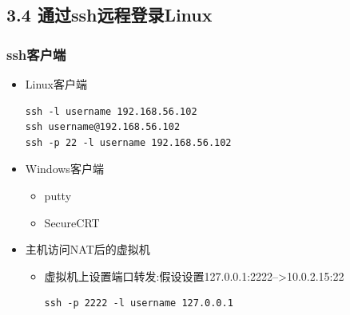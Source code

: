 \documentclass[xcolor=svgnames,bigger,presentation]{beamer}
\begin{document}
\subsection{3.4 通过ssh远程登录Linux}
\label{sec-3-4}
\begin{frame}[fragile]
\frametitle{ssh客户端}
\label{sec-3-4-1}
\begin{itemize}

\item Linux客户端\\
\label{sec-3-4-1-1}%
\begin{verbatim}
ssh -l username 192.168.56.102
ssh username@192.168.56.102
ssh -p 22 -l username 192.168.56.102
\end{verbatim}

\item Windows客户端
\label{sec-3-4-1-2}%
\begin{itemize}

\item putty
\label{sec-3-4-1-2-1}%

\item SecureCRT
\label{sec-3-4-1-2-2}%
\end{itemize} %

\item 主机访问NAT后的虚拟机
\label{sec-3-4-1-3}%
\begin{itemize}

\item 虚拟机上设置端口转发:假设设置127.0.0.1:2222-->10.0.2.15:22\\
\label{sec-3-4-1-3-1}%
\begin{verbatim}
ssh -p 2222 -l username 127.0.0.1
\end{verbatim}
\end{itemize} %
\end{itemize} %
\end{frame}
\end{document}
